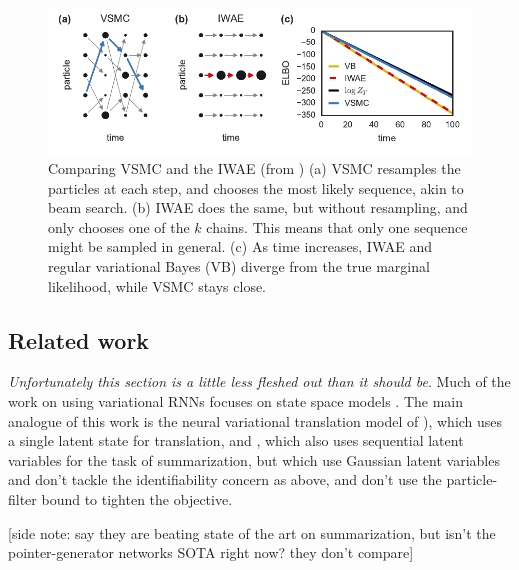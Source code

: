 \documentclass[12pt]{article}
\theoremstyle{definition}
\theoremstyle{remark}
\begin{document}
\begin{figure}[t]
  \begin{center}
    \includegraphics{vsmc.pdf}
  \end{center}
  \vspace{-5mm}
  \caption{Comparing {VSMC} and the {IWAE} (from \citep{naesseth2017variational})
    (a) {VSMC} resamples the particles at each step, and chooses the most likely sequence, akin to beam search.
    (b) {IWAE} does the same, but without resampling, and only chooses one of the $k$ chains. This means that only one sequence might be sampled in general.
    (c) As time increases, IWAE and regular variational Bayes (VB) diverge from the true marginal likelihood, while VSMC stays close.}
  \label{fig:vsmc}
\end{figure}

\subsection*{Related work}
\textit{Unfortunately this section is a little less fleshed out than it should be}. Much of the work on using variational RNNs focuses on state space models \citep{krishnan2017structured,chung2015recurrent,naesseth2017variational,maddison2017filtering}. The main analogue of this work is the neural variational translation model of \citet{zhang2016variational}), which uses a single latent state for translation, and \citet{li2017deep}, which also uses sequential latent variables for the task of summarization, but which use Gaussian latent variables and don't tackle the identifiability concern as above, and don't use the particle-filter bound to tighten the objective. 

\smallskip

[side note: \citet{li2017deep} say they are beating state of the art on summarization, but isn't the pointer-generator networks SOTA right now? they don't compare]  
\end{document}
